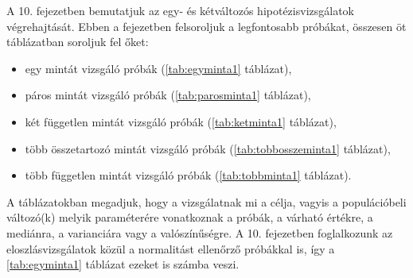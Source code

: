 \documentclass[
]{book}
\providecommand{\tightlist}{%
  \setlength{\itemsep}{0pt}\setlength{\parskip}{0pt}}
\begin{document}
A 10. fejezetben bemutatjuk az egy- és kétváltozós hipotézisvizsgálatok végrehajtását. Ebben a fejezetben felsoroljuk a legfontosabb próbákat, összesen öt táblázatban soroljuk fel őket:

\begin{itemize}
\tightlist
\item
  egy mintát vizsgáló próbák (\ref{tab:egyminta1} táblázat),
\item
  páros mintát vizsgáló próbák (\ref{tab:parosminta1} táblázat),
\item
  két független mintát vizsgáló próbák (\ref{tab:ketminta1} táblázat),
\item
  több összetartozó mintát vizsgáló próbák (\ref{tab:tobbosszeminta1} táblázat),
\item
  több független mintát vizsgáló próbák (\ref{tab:tobbminta1} táblázat).
\end{itemize}

A táblázatokban megadjuk, hogy a vizsgálatnak mi a célja, vagyis a populációbeli változó(k) melyik paraméterére vonatkoznak a próbák, a várható értékre, a mediánra, a varianciára vagy a valószínűségre. A 10. fejezetben foglalkozunk az eloszlásvizsgálatok közül a normalitást ellenőrző próbákkal is, így a \ref{tab:egyminta1} táblázat ezeket is számba veszi.
\end{document}
